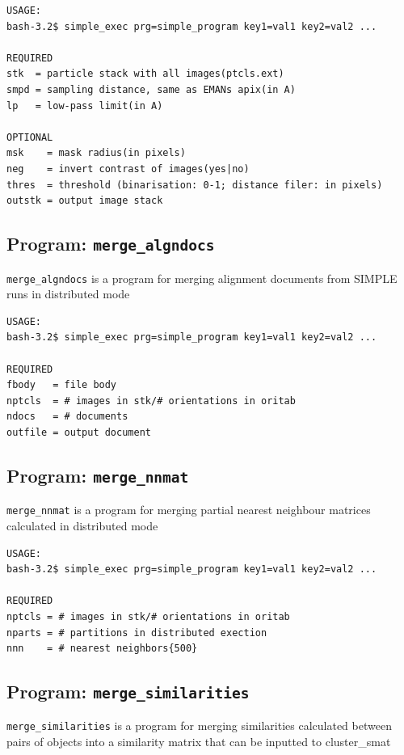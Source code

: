 \documentclass[a4paper,11pt]{article}
\newcommand{\prgname}[1]{\textcolor{NavyBlue}{\texttt{#1}}}
\begin{document}
\begin{verbatim}
USAGE:
bash-3.2$ simple_exec prg=simple_program key1=val1 key2=val2 ...

REQUIRED
stk  = particle stack with all images(ptcls.ext)
smpd = sampling distance, same as EMANs apix(in A)
lp   = low-pass limit(in A)

OPTIONAL
msk    = mask radius(in pixels)
neg    = invert contrast of images(yes|no)
thres  = threshold (binarisation: 0-1; distance filer: in pixels)
outstk = output image stack
\end{verbatim}

\subsection{Program: \prgname{merge\_algndocs}}
\label{merge_algndocs}
\prgname{merge\_algndocs} is a program for merging alignment documents from SIMPLE runs in distributed mode

\begin{verbatim}
USAGE:
bash-3.2$ simple_exec prg=simple_program key1=val1 key2=val2 ...

REQUIRED
fbody   = file body
nptcls  = # images in stk/# orientations in oritab
ndocs   = # documents
outfile = output document
\end{verbatim}

\subsection{Program: \prgname{merge\_nnmat}}
\label{merge_nnmat}
\prgname{merge\_nnmat} is a program for merging partial nearest neighbour matrices calculated in distributed mode

\begin{verbatim}
USAGE:
bash-3.2$ simple_exec prg=simple_program key1=val1 key2=val2 ...

REQUIRED
nptcls = # images in stk/# orientations in oritab
nparts = # partitions in distributed exection
nnn    = # nearest neighbors{500}
\end{verbatim}

\subsection{Program: \prgname{merge\_similarities}}
\label{merge_similarities}
\prgname{merge\_similarities} is a program for merging similarities calculated between pairs of objects into a similarity matrix that can be inputted to cluster\_smat
\end{document}
